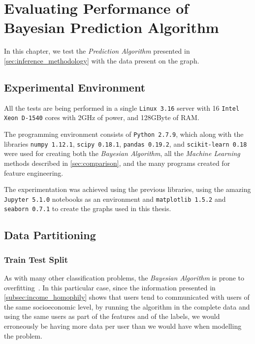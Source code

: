 
\chapter{Evaluating Performance of Bayesian Prediction Algorithm}
\label{sec:results}

In this chapter, we test the \emph{Prediction Algorithm} presented in \cref{sec:inference_methodology} with the data present on the graph.

\section{Experimental Environment}
\label{subsec:experimental_environment}

All the tests are being performed in a single \texttt{Linux 3.16} server with 16 \texttt{Intel Xeon D-1540} cores with 2GHz of power, and 128GByte of RAM\@.

The programming environment consists of \texttt{Python 2.7.9}, which along with the libraries \texttt{numpy 1.12.1}, \texttt{scipy 0.18.1}, \texttt{pandas 0.19.2}, and \texttt{scikit-learn 0.18}\cite{scikit-learn} were used for creating both the \emph{Bayesian Algorithm}, all the \emph{Machine Learning} methods described in \cref{sec:comparison}, and the many programs created for feature engineering.

The experimentation was achieved using the previous libraries, using the amazing \texttt{Jupyter 5.1.0} notebooks as an environment and \texttt{matplotlib 1.5.2} and \texttt{seaborn 0.7.1} to create the graphs used in this thesis.

\section{Data Partitioning}
\label{sec:data_partitioning}

\subsection{Train Test Split}
\label{subsec:train_test_split}

As with many other classification problems, the \emph{Bayesian Algorithm} is prone to overfitting~\cite{mitchellml1997}.
In this particular case, since the information presented in \cref{subsec:income_homophily} shows that users tend to communicated with users of the same socioeconomic level, by running the algorithm in the complete data and using the same users as part of the features and of the labels, we would erroneously be having more data per user than we would have when modelling the problem.

